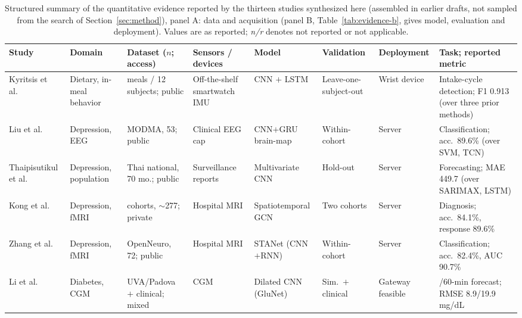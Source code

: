 \documentclass[journal]{IEEEtran}
\newif\ifsubmission
\begin{document}
\begin{table}[t]
\centering
\caption{Structured summary of the quantitative evidence reported by the thirteen studies synthesized here (assembled in earlier drafts, not sampled from the search of Section~\ref{sec:method})\ifsubmission\else, panel A: data and acquisition (panel B, Table~\ref{tab:evidence-b}, gives model, evaluation and deployment)\fi. Values are as reported; \emph{n/r} denotes not reported or not applicable.}
\label{tab:evidence}
\ifsubmission
\scriptsize
\setlength{\tabcolsep}{2.5pt}
\renewcommand{\arraystretch}{1.08}
\begin{tabularx}{\textwidth}{>{\raggedright\arraybackslash}p{1.9cm} >{\raggedright\arraybackslash}p{1.6cm} >{\raggedright\arraybackslash}p{2.2cm} >{\raggedright\arraybackslash}p{1.6cm} >{\raggedright\arraybackslash}p{1.9cm} >{\raggedright\arraybackslash}p{1.4cm} >{\raggedright\arraybackslash}p{1.7cm} >{\raggedright\arraybackslash}X}
\toprule
\textbf{Study} & \textbf{Domain} & \textbf{Dataset ($n$; access)} & \textbf{Sensors / devices} & \textbf{Model} & \textbf{Validation} & \textbf{Deployment} & \textbf{Task; reported metric} \\
\midrule
Kyritsis et al.~\cite{Kyritsis2019EatingBehavior} & Dietary, in-meal behavior & 21 meals / 12 subjects; public & Off-the-shelf smartwatch IMU & CNN $+$ LSTM & Leave-one-subject-out & Wrist device & Intake-cycle detection; F1 0.913 (over three prior methods) \\
\addlinespace[1pt]
Liu et al.~\cite{2} & Depression, EEG & MODMA, 53; public & Clinical EEG cap & CNN$+$GRU brain-map & Within-cohort & Server & Classification; acc.\ 89.6\% (over SVM, TCN) \\
\addlinespace[1pt]
Thaipisutikul et al.~\cite{3} & Depression, population & Thai national, 70 mo.; public & Surveillance reports & Multivariate CNN & Hold-out & Server & Forecasting; MAE 449.7 (over SARIMAX, LSTM) \\
\addlinespace[1pt]
Kong et al.~\cite{4} & Depression, fMRI & 2 cohorts, $\sim$277; private & Hospital MRI & Spatiotemporal GCN & Two cohorts & Server & Diagnosis; acc.\ 84.1\%, response 89.6\% \\
\addlinespace[1pt]
Zhang et al.~\cite{9} & Depression, fMRI & OpenNeuro, 72; public & Hospital MRI & STANet (CNN$+$RNN) & Within-cohort & Server & Classification; acc.\ 82.4\%, AUC 90.7\% \\
\addlinespace[1pt]
Li et al.~\cite{Li2020GluNet} & Diabetes, CGM & UVA/Padova $+$ clinical; mixed & CGM & Dilated CNN (GluNet) & Sim.\ $+$ clinical & Gateway feasible & 30/60-min forecast; RMSE 8.9/19.9 mg/dL \\

\end{tabularx}
\end{table}
\end{document}
